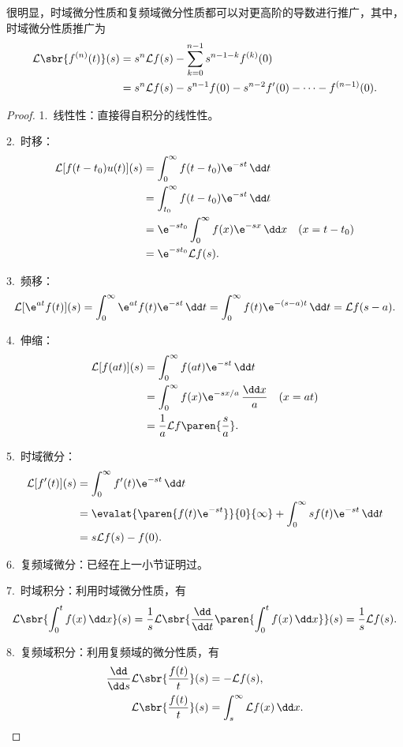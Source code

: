 \begin{remark}
    很明显，时域微分性质和复频域微分性质都可以对更高阶的导数进行推广，其中，时域微分性质推广为
    \begin{align}
        \mathcal{L}\sbr{f^{(n)}(t)}(s)&=s^n\mathcal{L}f(s)-\sum_{k=0}^{n-1}s^{n-1-k}f^{(k)}(0)\nonumber\\
        &=s^n\mathcal{L}f(s)-s^{n-1}f(0)-s^{n-2}f'(0)-\cdots-f^{(n-1)}(0).
    \end{align}
\end{remark}
\begin{proof}
    1.\ 线性性：直接得自积分的线性性。

    2.\ 时移：
    \begin{align}
        \mathcal{L}[f(t-t_0)u(t)](s)&=\int_0^{\infty}f(t-t_0)\e^{-st}\,\dd t\nonumber\\
        &=\int_{t_0}^{\infty}f(t-t_0)\e^{-st}\,\dd t\nonumber\\
        &=\e^{-st_0}\int_0^{\infty}f(x)\e^{-sx}\,\dd x&(x=t-t_0)\nonumber\\
        &=\e^{-st_0}\mathcal{L}f(s).
    \end{align}

    3.\ 频移：
    \begin{equation}
        \mathcal{L}[\e^{at}f(t)](s)=\int_0^{\infty}\e^{at}f(t)\e^{-st}\,\dd t=\int_0^{\infty}f(t)\e^{-(s-a)t}\,\dd t=\mathcal{L}f(s-a).
    \end{equation}

    4.\ 伸缩：
    \begin{align}
        \mathcal{L}[f(at)](s)&=\int_0^{\infty}f(at)\e^{-st}\,\dd t\nonumber\\
        &=\int_0^{\infty}f(x)\e^{-sx/a}\,\frac{\dd x}{a}&(x=at)\nonumber\\
        &=\frac{1}{a}\mathcal{L}f\paren{\frac{s}{a}}.
    \end{align}

    5.\ 时域微分：
    \begin{align}
        \mathcal{L}[f'(t)](s)&=\int_0^{\infty}f'(t)\e^{-st}\,\dd t\nonumber\\
        &=\evalat{\paren{f(t)\e^{-st}}}{0}{\infty}+\int_0^{\infty}sf(t)\e^{-st}\,\dd t\nonumber\\
        &=s\mathcal{L}f(s)-f(0).
    \end{align}

    6.\ 复频域微分：已经在上一小节证明过。

    7.\ 时域积分：利用时域微分性质，有
    \begin{equation}
        \mathcal{L}\sbr{\int_0^t f(x)\,\dd x}(s)=\frac{1}{s}\mathcal{L}\sbr{\frac{\dd}{\dd t}\paren{\int_0^t f(x)\,\dd x}}(s)=\frac{1}{s}\mathcal{L}f(s).
    \end{equation}

    8.\ 复频域积分：利用复频域的微分性质，有
    \begin{align}
        \frac{\dd}{\dd s}\mathcal{L}\sbr{\frac{f(t)}{t}}(s)&=-\mathcal{L}f(s),\\
        \mathcal{L}\sbr{\frac{f(t)}{t}}(s)&=\int_s^{\infty}\mathcal{L}f(x)\,\dd x.
    \end{align}
\end{proof}

